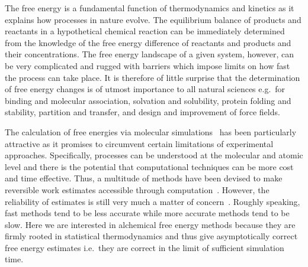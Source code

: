 \documentclass[journal=jctcce,manuscript=article]{achemso}
\begin{document}
The free energy is a fundamental function of thermodynamics and
kinetics as it explains how processes in nature evolve.  The equilibrium 
balance of products and reactants in
a hypothetical chemical reaction can be immediately determined
from the knowledge of the free energy difference of reactants and
products and their concentrations.  The free energy landscape of a given 
system, however, can be very complicated and rugged with barriers which impose
limits on how fast the process can take place.  It is therefore of
little surprise that the determination of free energy changes is of
utmost importance to all natural sciences e.g.\ for binding and
molecular association, solvation and solubility, protein folding and
stability, partition and transfer, and design and improvement of force
fields. 

The calculation of free energies via molecular 
simulations~\cite{hansen_practical_2014, doi:10.1021/jp102971x,
  Gallicchio201127, doi:10.1080/08927022.2015.1132317,
  doi:10.1146/annurev.matsci.32.111901.153708} has been particularly
attractive as it promises to circumvent certain limitations of experimental
approaches. Specifically, processes can be understood at the molecular and 
atomic level and 
there is the potential that computational techniques can be more cost and time 
effective.  Thus, a
multitude of methods have been devised to make reversible work
estimates accessible through computation~\cite{hansen_practical_2014,
  doi:10.1021/jp102971x, Gallicchio201127,
  doi:10.1080/08927022.2015.1132317,
  doi:10.1146/annurev.matsci.32.111901.153708}.  However, the
reliability of estimates is still very much a matter of
concern~\cite{doi:10.1021/jp102971x, doi:10.1021/acs.jctc.5b00179}.
Roughly speaking, fast methods tend to be less accurate while more
accurate methods tend to be slow.  Here we are interested in alchemical free 
energy methods because they are firmly rooted in statistical thermodynamics and 
thus give asymptotically correct free energy estimates i.e.\ they are correct 
in the limit of sufficient simulation time.
\end{document}
